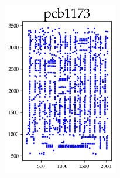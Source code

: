\begin{appendices}
\begin{figure}[H]
\includegraphics[width=5cm]{../tsplib_euc2d_pictures_of_instances/pcb1173.png}

\end{figure}


\end{appendices}
